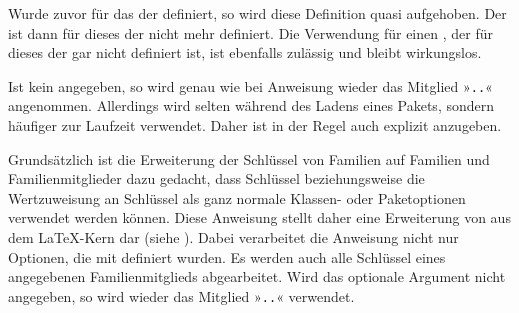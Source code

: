 \begin{Declaration}
\end{Declaration}
Wurde zuvor  für das
 der  definiert, so wird diese Definition
quasi aufgehoben. Der  ist dann für dieses 
der  nicht mehr definiert. Die Verwendung für einen
, der für dieses  der  gar
nicht definiert ist, ist ebenfalls zulässig und bleibt wirkungslos.

Ist kein  angegeben, so wird genau wie bei Anweisung
 wieder das Mitglied
»\texttt{.}\texttt{.}« angenommen. Allerdings
wird  selten während des Ladens eines Pakets,
sondern häufiger zur Laufzeit verwendet. Daher ist  in der
Regel auch explizit anzugeben.%
\EndIndexGroup


\begin{Declaration}
\end{Declaration}
Grundsätzlich ist die Erweiterung der Schlüssel von Familien auf Familien und
Familienmitglieder dazu gedacht, dass Schlüssel beziehungsweise die
Wertzuweisung an Schlüssel als ganz normale Klassen- oder Paketoptionen
verwendet werden können. Diese Anweisung stellt daher eine Erweiterung von
%
 aus dem \LaTeX-Kern dar (siehe
\cite{latex:clsguide}). Dabei verarbeitet die Anweisung nicht nur Optionen,
die mit %
 definiert wurden. Es werden auch alle
Schlüssel eines angegebenen Familienmitglieds abgearbeitet. Wird das optionale
Argument  nicht angegeben, so wird wieder das Mitglied
»\texttt{.}\texttt{.}« verwendet.

